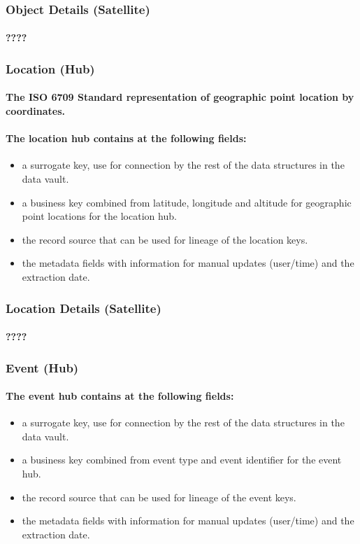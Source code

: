 \documentclass{acm_proc_article-sp}
\begin{document}
\subsubsection{Object Details (Satellite)}
\paragraph{????}
\subsubsection{Location (Hub)}
\paragraph{The ISO 6709 Standard representation of geographic point location by coordinates.}
\paragraph{The location hub contains at the following fields:}
\begin{itemize}
  \item{a surrogate key, use for connection by the rest of the data structures in the data vault.}
  \item{a business key combined from latitude, longitude and altitude for geographic point locations for the location hub.}
  \item{the record source that can be used for lineage of the location keys.}
  \item{the metadata fields with information for manual updates (user/time) and the extraction date.}
\end{itemize}
\subsubsection{Location Details (Satellite)}
\paragraph{????}
\subsubsection{Event (Hub)}
\paragraph{The event hub contains at the following fields:}
\begin{itemize}
  \item{a surrogate key, use for connection by the rest of the data structures in the data vault.}
  \item{a business key combined from event type and event identifier for the event hub.}
  \item{the record source that can be used for lineage of the event keys.}
  \item{the metadata fields with information for manual updates (user/time) and the extraction date.}
\end{itemize}
\end{document}
